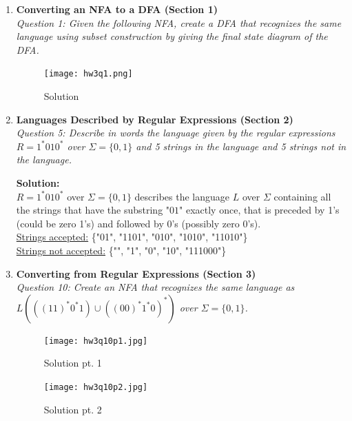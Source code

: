 \documentclass[10pt,letterpaper,unboxed,cm]{article}
\begin{document}
\begin{enumerate}

\item \textbf{Converting an NFA to a DFA (Section 1)} \\
\emph{Question 1: Given the following NFA, create a DFA that recognizes the same language using subset construction by giving the final state diagram of the DFA.}

\begin{figure}[h]
    \centering
    \texttt{[image: hw3q1.png]}
    \caption{Solution}
    \label{fig:placeholder}
\end{figure}

\pagebreak 

\item \textbf{Languages Described by Regular Expressions (Section 2)} \\
\emph{Question 5: Describe in words the language given by the regular expressions $R=1^*010^*$ over $\Sigma = \{0,1\}$ and 5 strings in the language and 5 strings not in the language.}

\textbf{Solution:}
\\$R=1^*010^*$ over $\Sigma=\{0,1\}$ describes the language $L$ over $\Sigma$ containing all the strings that have the substring "$01$" exactly once, that is preceded by 1's (could be zero 1's) and followed by 0's (possibly zero 0's).
\\\underline{Strings accepted:} \{"01", "1101", "010", "1010", "11010"\}
\\\underline{Strings not accepted:} \{"", "1", "0", "10", "111000"\}

\pagebreak

\item \textbf{Converting from Regular Expressions (Section 3)} \\
\emph{Question 10: Create an NFA that recognizes the same language as $L(((11)^*0^*1)\cup((00)^*1^*0)^*)$ over $\Sigma=\{0,1\}$.}

\begin{figure}[h]
    \centering
    \texttt{[image: hw3q10p1.jpg]}
    \caption{Solution pt. 1}
    \label{fig:placeholder}
\end{figure}

\pagebreak

\begin{figure}[h]
    \centering
    \texttt{[image: hw3q10p2.jpg]}
    \caption{Solution pt. 2}
    \label{fig:placeholder}
\end{figure}


\end{enumerate}
\end{document}
